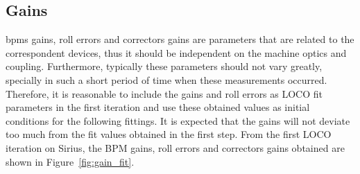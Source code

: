 \subsection{Gains}
\glspl{bpm} gains, roll errors and correctors gains are parameters that are related to the correspondent devices, thus it should be independent on the machine optics and coupling. Furthermore, typically these parameters should not vary greatly, specially in such a short period of time when these measurements occurred. Therefore, it is reasonable to include the gains and roll errors as LOCO fit parameters in the first iteration and use these obtained values as initial conditions for the following fittings. It is expected that the gains will not deviate too much from the fit values obtained in the first step. From the first LOCO iteration on Sirius, the BPM gains, roll errors and correctors gains obtained are shown in Figure~\ref{fig:gain_fit}.
